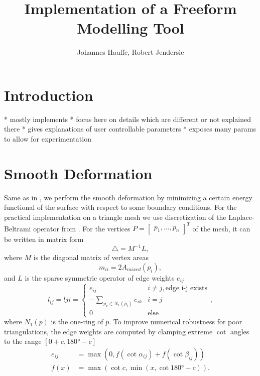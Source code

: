 \documentclass[twocolumn]{article}
\begin{document}
\title{Implementation of a Freeform Modelling Tool }


\author{Johannes Hauffe, Robert Jendersie}

\maketitle

\section{Introduction}
* mostly implements \cite{botsch2004intuitive}
* focus here on details which are different or not explained there
* gives explanations of user controllable parameters
* exposes many params to allow for experimentation

\section{Smooth Deformation}
Same as in \cite{botsch2004intuitive}, we perform the smooth deformation by minimizing a certain energy functional of the surface with respect to some boundary conditions. For the practical implementation on a triangle mesh we use discretization of the Laplace-Beltrami operator from \cite{meyer2003discrete}. For the vertices $P = \begin{bmatrix}p_1,\dots, p_n\end{bmatrix}^T$ of the mesh, it can be written in matrix form
\begin{equation}\label{laplace}
\triangle = M^{-1} L,
\end{equation}
where $M$ is the diagonal matrix of vertex areas 
\begin{equation*}
m_{ii} = 2 A_{mixed}(p_i),
\end{equation*} and $L$ is the sparse symmetric operator of edge weights $e_{ij}$
\begin{equation*}
l_{ij} = l{ji} = \begin{cases} e_{ij} & i \neq j, \text{edge i-j exists} \\ -\sum_{p_k \in N_1(p_i)} e_{ik} & i=j \\ 0 & \text{else}  \end{cases},
\end{equation*}
where $N_1(p)$ is the one-ring of $p$. To improve numerical robustness for poor triangulations, the edge weights are computed by clamping extreme $\cot$ angles to the range $[0+c,\ang{180}-c]$
\begin{align*}
e_{ij} &= \max(0, f(\cot \alpha_{ij}) + f(\cot \beta_{ij})) \\
f(x) &= \max(\cot c, \min(x, \cot \ang{180}-c)).
\end{align*}
\end{document}
